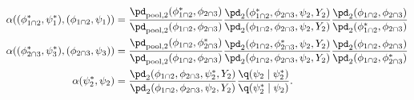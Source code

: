 \begin{align}
  \alpha((\phi_{1 \cap 2}^{*}, \psi_{1}^{*}), (\phi_{1 \cap 2}, \psi_{1})) &= 
    \frac {
      \pd_{\text{pool}, 2}(\phi_{1 \cap 2}^{*}, \phi_{2 \cap 3})
    } {
      \pd_{\text{pool}, 2}(\phi_{1 \cap 2}, \phi_{2 \cap 3})
    }
    \frac {
      \pd_{2}(\phi_{1 \cap 2}^{*}, \phi_{2 \cap 3}, \psi_{2}, Y_{2})
    } {
      \pd_{2}(\phi_{1 \cap 2}, \phi_{2 \cap 3}, \psi_{2}, Y_{2})
    }
    \frac {
      \pd_{2} (\phi_{1 \cap 2}, \phi_{2 \cap 3})
    } {
      \pd_{2} (\phi_{1 \cap 2}^{*}, \phi_{2 \cap 3})
    }
  \\
  \alpha((\phi_{2 \cap 3}^{*}, \psi_{3}^{*}), (\phi_{2 \cap 3}, \psi_{3})) &= 
    \frac {
      \pd_{\text{pool}, 2}(\phi_{1 \cap 2}, \phi_{2 \cap 3}^{*})
    } {
      \pd_{\text{pool}, 2}(\phi_{1 \cap 2}, \phi_{2 \cap 3})
    }
    \frac {
      \pd_{2}(\phi_{1 \cap 2}, \phi_{2 \cap 3}^{*}, \psi_{2}, Y_{2})
    } {
      \pd_{2}(\phi_{1 \cap 2}, \phi_{2 \cap 3}, \psi_{2}, Y_{2})
    }
    \frac {
      \pd_{2} (\phi_{1 \cap 2}, \phi_{2 \cap 3})
    } {
      \pd_{2} (\phi_{1 \cap 2}, \phi_{2 \cap 3}^{*})
    }
  \\
  \alpha(\psi_{2}^{*}, \psi_{2}) &=
    \frac {
      \pd_{2}(\phi_{1 \cap 2}, \phi_{2 \cap 3}, \psi_{2}^{*}, Y_{2})
    } {
      \pd_{2}(\phi_{1 \cap 2}, \phi_{2 \cap 3}, \psi_{2}, Y_{2})
    }
    \frac {
      \q(\psi_{2} \mid \psi_{2}^{*})
    } {
      \q(\psi_{2}^{*} \mid \psi_{2})
    }.
  \label{eqn:stage-two-acceptance}
\end{align}